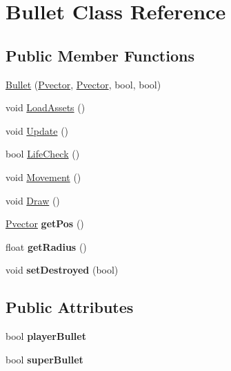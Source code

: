 \hypertarget{class_bullet}{}\section{Bullet Class Reference}
\label{class_bullet}
\subsection*{Public Member Functions}
\begin{DoxyCompactItemize}
\item 
\hyperlink{class_bullet_a553afe91ba9760d22b57cbf6f53c6feb}{Bullet} (\hyperlink{class_pvector}{Pvector}, \hyperlink{class_pvector}{Pvector}, bool, bool)
\item 
void \hyperlink{class_bullet_a5b84efc6a1415e3ad88a2633268e3ff1}{Load\+Assets} ()
\item 
void \hyperlink{class_bullet_a180b7054fdf2547b1d1e0de7d8001bf9}{Update} ()
\item 
bool \hyperlink{class_bullet_a757c394af4c888c6761bf32925a747ab}{Life\+Check} ()
\item 
void \hyperlink{class_bullet_a2f4547c6e79f2c703dd915e623efce82}{Movement} ()
\item 
void \hyperlink{class_bullet_a17d4579dee8d6eac9d519cec20cb75a4}{Draw} ()
\item 
\hyperlink{class_pvector}{Pvector} {\bfseries get\+Pos} ()\hypertarget{class_bullet_a2deda94a9e8cf0e965705d1a84aa303d}{}\label{class_bullet_a2deda94a9e8cf0e965705d1a84aa303d}

\item 
float {\bfseries get\+Radius} ()\hypertarget{class_bullet_a1979905e213e11ede2ce8fc44642e8cc}{}\label{class_bullet_a1979905e213e11ede2ce8fc44642e8cc}

\item 
void {\bfseries set\+Destroyed} (bool)\hypertarget{class_bullet_a7d9ed238b2dadcc802008ba3d70f3276}{}\label{class_bullet_a7d9ed238b2dadcc802008ba3d70f3276}

\end{DoxyCompactItemize}
\subsection*{Public Attributes}
\begin{DoxyCompactItemize}
\item 
bool {\bfseries player\+Bullet}\hypertarget{class_bullet_afdaf4761983c08764072fb938de0e427}{}\label{class_bullet_afdaf4761983c08764072fb938de0e427}

\item 
bool {\bfseries super\+Bullet}\hypertarget{class_bullet_a14a46d142693b70910c19eb1db286ad4}{}\label{class_bullet_a14a46d142693b70910c19eb1db286ad4}

\end{DoxyCompactItemize}
